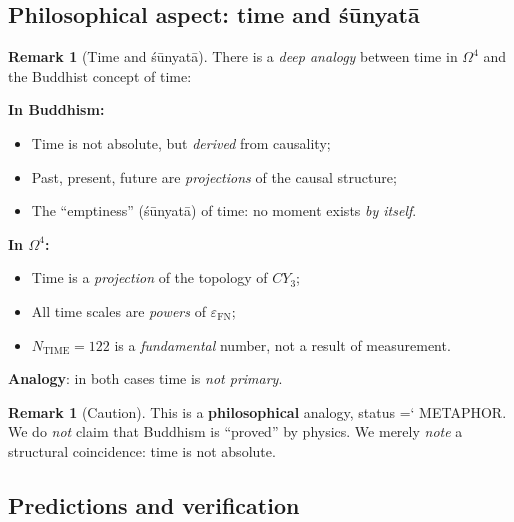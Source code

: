 \documentclass[11pt,a4paper]{article}
\newcommand{\CY}{CY_3}
\newcommand{\Om}{\Omega^4}
\newcommand{\epsFN}{\varepsilon_{\text{FN}}}
\newcommand{\shunyata}{\'s\=unyat\=a}
\renewcommand{\texttt}[1]{{\ttfamily\hyphenchar\font=`\- #1}}
\theoremstyle{definition}
\newtheorem{remark}[theorem]{Remark}
\begin{document}
\subsection{Philosophical aspect: time and śūnyatā}
\label{subsec:time-philosophy}

\begin{remark}[Time and śūnyatā]
\label{rem:time-shunyata}
There is a \emph{deep analogy} between time in $\Om$ and the Buddhist 
concept of time:

\medskip\noindent
\textbf{In Buddhism:}
\begin{itemize}
    \item Time is not absolute, but \emph{derived} from 
          causality;
    \item Past, present, future are \emph{projections} of the 
          causal structure;
    \item The ``emptiness'' (\shunyata) of time: no moment 
          exists \emph{by itself}.
\end{itemize}

\medskip\noindent
\textbf{In $\Om$:}
\begin{itemize}
    \item Time is a \emph{projection} of the topology of $\CY$;
    \item All time scales are \emph{powers} of $\epsFN$;
    \item $N_{\text{TIME}} = 122$ is a \emph{fundamental} number, 
          not a result of measurement.
\end{itemize}

\medskip\noindent
\textbf{Analogy}: in both cases time is \emph{not primary}.
\end{remark}

\begin{remark}[Caution]
\label{rem:time-caution}
This is a \textbf{philosophical} analogy, status \texttt{METAPHOR}. We 
do \emph{not} claim that Buddhism is ``proved'' by physics. We merely 
\emph{note} a structural coincidence: time is not absolute.
\end{remark}

\subsection{Predictions and verification}
\label{subsec:time-predictions}
\end{document}

